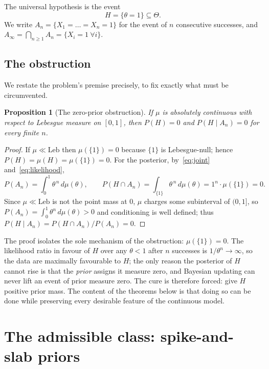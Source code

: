 \documentclass{amsart}
\newtheorem{proposition}{Proposition}
\theoremstyle{definition}
\begin{document}
The universal hypothesis is the event
\begin{equation}\label{eq:H}
  H=\{\theta=1\}\subseteq\Theta .
\end{equation}
We write $A_n=\{X_1=\dots=X_n=1\}$ for the event of $n$ consecutive successes,
and $A_\infty=\bigcap_{n\ge1}A_n=\{X_i=1\ \forall i\}$.

\subsection{The obstruction}
We restate the problem's premise precisely, to fix exactly what must be
circumvented.

\begin{proposition}[The zero-prior obstruction]\label{prop:obstruction}
If $\mu$ is absolutely continuous with respect to Lebesgue measure on $[0,1]$,
then $P(H)=0$ and $P(H\mid A_n)=0$ for every finite $n$.
\end{proposition}

\begin{proof}
If $\mu\ll\mathrm{Leb}$ then $\mu(\{1\})=0$ because $\{1\}$ is Lebesgue-null;
hence $P(H)=\mu(H)=\mu(\{1\})=0$. For the posterior, by~\eqref{eq:joint}
and~\eqref{eq:likelihood},
\[
  P(A_n)=\int_0^1\theta^{\,n}\,d\mu(\theta),\qquad
  P(H\cap A_n)=\int_{\{1\}}\theta^{\,n}\,d\mu(\theta)=1^n\cdot\mu(\{1\})=0 .
\]
Since $\mu\ll\mathrm{Leb}$ is not the point mass at $0$, $\mu$ charges some
subinterval of $(0,1]$, so $P(A_n)=\int_0^1\theta^n\,d\mu(\theta)>0$ and
conditioning is well defined; thus
$P(H\mid A_n)=P(H\cap A_n)/P(A_n)=0$.
\end{proof}

The proof isolates the sole mechanism of the obstruction: $\mu(\{1\})=0$. The
likelihood ratio in favour of $H$ over any $\theta<1$ after $n$ successes is
$1/\theta^n\to\infty$, so the data are maximally favourable to $H$; the only
reason the posterior of $H$ cannot rise is that the \emph{prior} assigns it
measure zero, and Bayesian updating can never lift an event of prior measure
zero. The cure is therefore forced: give $H$ positive prior mass. The content
of the theorems below is that doing so can be done while preserving every
desirable feature of the continuous model.

\section{The admissible class: spike-and-slab priors}\label{sec:class}
\end{document}
